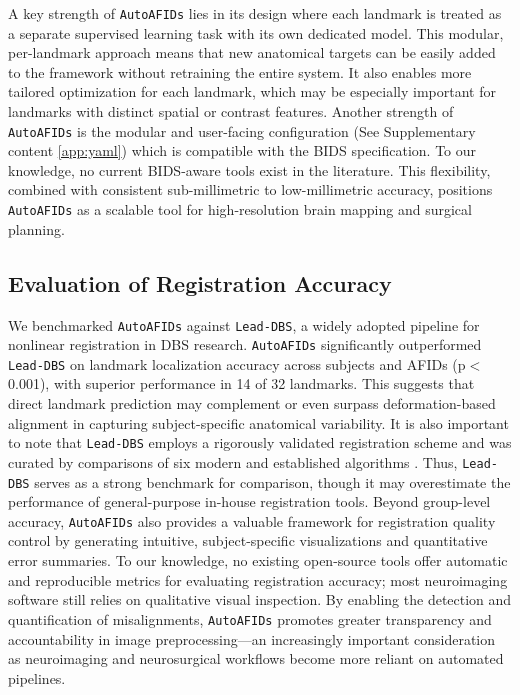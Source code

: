 A key strength of \texttt{AutoAFIDs} lies in its design where each landmark is treated as a separate supervised learning task with its own dedicated model. This modular, per-landmark approach means that new anatomical targets can be easily added to the framework without retraining the entire system. It also enables more tailored optimization for each landmark, which may be especially important for landmarks with distinct spatial or contrast features. Another strength of \texttt{AutoAFIDs} is the modular and user-facing configuration (See Supplementary content \ref{app:yaml}) which is compatible with the BIDS specification. To our knowledge, no current BIDS-aware tools exist in the literature. This flexibility, combined with consistent sub-millimetric to low-millimetric accuracy, positions \texttt{AutoAFIDs} as a scalable tool for high-resolution brain mapping and surgical planning.

\subsection{Evaluation of Registration Accuracy}

We benchmarked \texttt{AutoAFIDs} against \texttt{Lead-DBS}, a widely adopted pipeline for nonlinear registration in DBS research. \texttt{AutoAFIDs} significantly outperformed \texttt{Lead-DBS} on landmark localization accuracy across subjects and AFIDs (p\(<\)0.001), with superior performance in 14 of 32 landmarks. This suggests that direct landmark prediction may complement or even surpass deformation-based alignment in capturing subject-specific anatomical variability. It is also important to note that \texttt{Lead-DBS} employs a rigorously validated registration scheme and was curated by comparisons of six modern and established algorithms \cite{Ewert2019-cc}. Thus, \texttt{Lead-DBS} serves as a strong benchmark for comparison, though it may overestimate the performance of general-purpose in-house registration tools. Beyond group-level accuracy, \texttt{AutoAFIDs} also provides a valuable framework for registration quality control by generating intuitive, subject-specific visualizations and quantitative error summaries. To our knowledge, no existing open-source tools offer automatic and reproducible metrics for evaluating registration accuracy; most neuroimaging software still relies on qualitative visual inspection. By enabling the detection and quantification of misalignments, \texttt{AutoAFIDs} promotes greater transparency and accountability in image preprocessing—an increasingly important consideration as neuroimaging and neurosurgical workflows become more reliant on automated pipelines.

